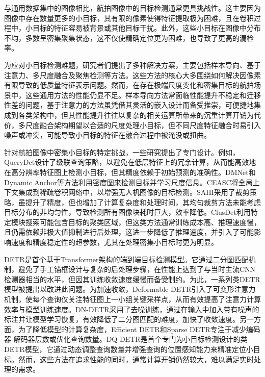 与通用数据集中的图像相比，航拍图像中的目标检测通常更具挑战性。这主要因为图像中存在数量更多的小目标，其有限的像素使得特征提取极为困难，且在卷积过程中，小目标的特征容易被背景或其他目标干扰。此外，这些小目标在图像中分布不均，多数呈密集聚集状态，这不仅使精确定位更为困难，也导致了更高的漏检率。

为应对小目标检测难题，研究者们提出了多种解决方案，主要包括样本导向\cite{kisantal2019augmentation}、基于注意力\cite{Lu2021AttentionFFSSD}、多尺度融合\cite{Singh2017SNIP}及聚焦检测\cite{Yang2019ClusteredOD,Xu2025DynamicAnchor}等方法。这些方法的核心大多围绕如何解决因像素有限导致的低质量特征表示问题。然而，在存在极端尺度变化和密集目标的航拍场景中，这些通用方法的性能仍显不足。样本导向方法常面临性能提升不稳定和迁移性差的问题，基于注意力的方法虽凭借其灵活的嵌入设计而备受推崇，可便捷地集成到各类架构中，但其性能提升往往以复杂的相关运算所带来的沉重计算开销为代价，多尺度融合架构期望以合适的尺度处理小目标，但不同尺度特征融合时易引入噪声或冲突，可能导致小目标的特征在融合过程中被淹没或扭曲。

针对航拍图像中密集小目标的特定挑战，一些研究提出了专门设计。例如，QueryDet\cite{Yang2022QueryDet}设计了级联查询策略，以避免在低层特征上的冗余计算，从而能高效地在高分辨率特征图上检测小目标，但其精度依赖于初始预测的准确性。DMNet\cite{Li2020DMNet}和Dynamic Anchor\cite{Xu2025DynamicAnchor}等方法利用密度图来检测目标并学习尺度信息。CEASC\cite{Du2023CEASC}将全局上下文集成到稀疏卷积网络中，以增强无人机图像的目标检测。SAHI\cite{Akyon2022SAHI}采用了裁剪策略，虽提升了精度，但也增加了计算复杂度和处理时间，其均匀裁剪方法未能考虑目标分布的非均匀性，导致检测所有图像块耗时巨大，效率降低。ClusDet\cite{Yang2019ClusteredOD}利用特定模块搜索可能包含目标的聚类区域，但这类方法通常训练成本高、推理速度慢，且仍需依赖非极大值抑制进行后处理，这进一步降低了推理速度，并引入了可能影响速度和精度稳定性的超参数，尤其在处理密集小目标时更为明显。

DETR\cite{Carion2020DETR}是首个基于Transformer架构的端到端目标检测模型。它通过二分图匹配机制，避免了手工锚框设计与复杂的后处理步骤，在性能上达到了与当时主流CNN检测器相当的水平，但因其训练收敛速度缓慢而备受制约。为此，一系列类DETR模型被提出以改进此问题。为加速收敛，Deformable-DETR\cite{Zhu2020DeformableDETR}引入了可变形注意力机制，使每个查询仅关注特征图上一小组关键采样点，从而有效提高了注意力计算效率与模型训练速度。DN-DETR\cite{Li2022DnDETR}采用了去噪训练，通过在输入中加入带有噪声的标注并让模型学习恢复，有效降低了二分图匹配的难度，加快了收敛速度。另一方面，为了降低模型的计算复杂度，Efficient DETR\cite{Yao2021EfficientDETR}和Sparse DETR\cite{Roh2021SparseDETR}专注于减少编码器-解码器层数或优化查询数量。DQ-DETR\cite{Huang2024DQDETR}是首个专门为小目标检测设计的类DETR模型，它通过动态调整查询数量并增强查询的位置感知能力来精准定位小目标。然而，这些方法在追求性能的同时，通常计算开销仍然较大，难以满足实时处理的需求。


